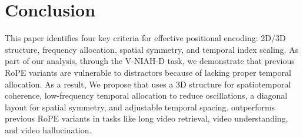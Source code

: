 \section{Conclusion}
This paper identifies four key criteria for effective positional encoding: 2D/3D structure, frequency allocation, spatial symmetry, and temporal index scaling. As part of our analysis, through the V-NIAH-D task, we demonstrate that previous RoPE variants are vulnerable to distractors because of lacking proper temporal allocation. As a result, We propose \methodname that uses a 3D structure for spatiotemporal coherence, low-frequency temporal allocation to reduce oscillations, a diagonal layout for spatial symmetry, and adjustable temporal spacing. \methodname outperforms previous RoPE variants in tasks like long video retrieval, video understanding, and video hallucination.

